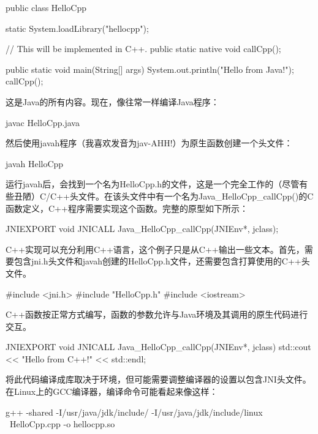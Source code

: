 \begin{cpp}
public class HelloCpp
{
    static { System.loadLibrary("hellocpp"); }

    // This will be implemented in C++.
    public static native void callCpp();

    public static void main(String[] args)
    {
        System.out.println("Hello from Java!");
        callCpp();
    }
}
\end{cpp}

这是Java的所有内容。现在，像往常一样编译Java程序：

\begin{shell}
javac HelloCpp.java
\end{shell}

然后使用javah程序（我喜欢发音为jav-AHH!）为原生函数创建一个头文件：

\begin{shell}
javah HelloCpp
\end{shell}

运行javah后，会找到一个名为HelloCpp.h的文件，这是一个完全工作的（尽管有些丑陋）C/C++头文件。在该头文件中有一个名为Java\_HelloCpp\_callCpp()的C函数定义，C++程序需要实现这个函数。完整的原型如下所示：

\begin{cpp}
JNIEXPORT void JNICALL Java_HelloCpp_callCpp(JNIEnv*, jclass);
\end{cpp}

C++实现可以充分利用C++语言，这个例子只是从C++输出一些文本。首先，需要包含jni.h头文件和javah创建的HelloCpp.h文件，还需要包含打算使用的C++头文件。

\begin{cpp}
#include <jni.h>
#include "HelloCpp.h"
#include <iostream>
\end{cpp}

C++函数按正常方式编写，函数的参数允许与Java环境及其调用的原生代码进行交互。

\begin{cpp}
JNIEXPORT void JNICALL Java_HelloCpp_callCpp(JNIEnv*, jclass)
{
    std::cout << "Hello from C++!" << std::endl;
}
\end{cpp}

将此代码编译成库取决于环境，但可能需要调整编译器的设置以包含JNI头文件。在Linux上的GCC编译器，编译命令可能看起来像这样：

\begin{shell}
g++ -shared -I/usr/java/jdk/include/ -I/usr/java/jdk/include/linux \
HelloCpp.cpp -o hellocpp.so
\end{shell}

